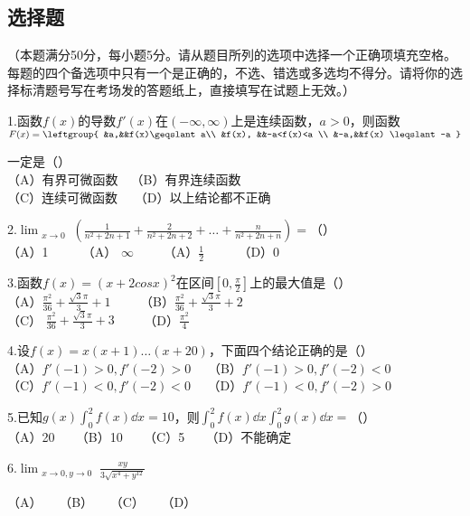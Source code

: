 
\begin{issues}
\issueDraft
\end{issues}

\subsection{选择题}（本题满分50分，每小题5分。请从题目所列的选项中选择一个正确项填充空格。每题的四个备选项中只有一个是正确的，不选、错选或多选均不得分。请将你的选择标清题号写在考场发的答题纸上，直接填写在试题上无效。）

1.函数$f(x)$的导数$f'(x)$在$(-\infty,\infty)$上是连续函数，$a>0$，则函数$F(x)=\leftgroup{
&a,&&f(x)\geqslant a\\ 
&f(x), &&-a<f(x)<a \\
&-a,&&f(x) \leqslant -a }$

一定是（）\\
（A）有界可微函数$\quad$（B）有界连续函数 \\
（C）连续可微函数$\quad$ （D）以上结论都不正确

2.$\displaystyle \lim_{\substack{x \to 0}}(\frac{1}{n^2+2n+1}+\frac{2}{n^2+2n+2}+\dots+\frac{n}{n^2+2n+n})=$（）\\
（A）1 $\qquad$ （A） $ \infty \qquad$  （A）$\frac{1}{2}$ $\qquad$   （D）0

3.函数$f(x)=(x+2cosx)^2$在区间$[0,\frac{\pi}{2}]$上的最大值是（）\\
（A）$\frac{\pi ^2}{36}+\frac{\sqrt{3}\pi}{3}+1 \qquad$     （B）$\frac{\pi ^2}{36}+\frac{\sqrt{3}\pi}{3}+2 \qquad$  \\
（C） $\frac{\pi ^2}{36}+\frac{\sqrt{3}\pi}{3}+3\qquad$       （D）$\frac{\pi^2}{4} \qquad$  

4.设$f(x)=x(x+1)\dots(x+20)$，下面四个结论正确的是（）\\
（A）$f'(-1)>0,f'(-2)>0\quad$ （B）$f'(-1)>0,f'(-2)<0\quad$ \\
（C）$f'(-1)<0,f'(-2)<0\quad$ （D）$f'(-1)<0,f'(-2)>0$

5.已知$\displaystyle g(x)\int_{0}^{2} f(x)\dd{x}=10$，则$\displaystyle \int_{0}^{2} f(x)\dd{x} \int_{0}^{2} g(x)\dd{x}=$（）\\
（A）20 $\quad$ （B）10 $\quad$ （C）5 $\quad$ （D）不能确定

6.$ \displaystyle \lim_{\substack{x \to 0,y \to 0}} \frac{xy}{3\sqrt{x^4+y^12}}$

（A）$\quad$ （B）$\quad$ （C）$\quad$ （D）




